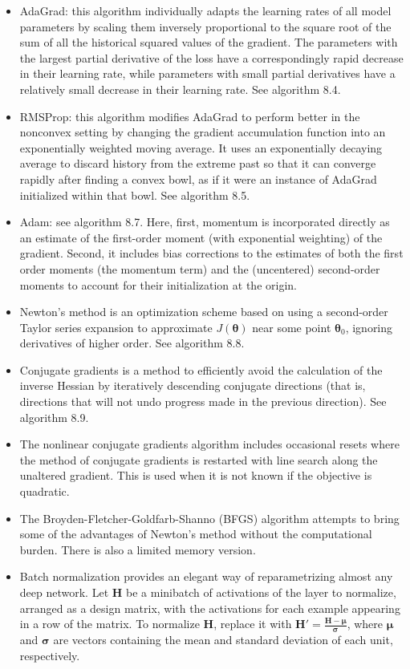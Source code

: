 \documentclass{article}
\begin{document}
\begin{itemize}
\item AdaGrad: this algorithm individually adapts the learning rates of all model parameters by scaling them inversely proportional to the square root of the sum of all the historical squared values of the gradient. The parameters with the largest partial derivative of the loss have a correspondingly rapid decrease in their learning rate, while parameters with small partial derivatives have a relatively small decrease in their learning rate. See algorithm 8.4.
\item RMSProp: this algorithm modifies AdaGrad to perform better in the nonconvex setting by changing the gradient accumulation function into an exponentially weighted moving average. It uses an exponentially decaying average to discard history from the extreme past so that it can converge rapidly after finding a convex bowl, as if it were an instance of AdaGrad initialized within that bowl. See algorithm 8.5.
\item Adam: see algorithm 8.7. Here, first, momentum is incorporated directly as an estimate of the first-order moment (with exponential weighting) of the gradient. Second, it includes bias corrections to the estimates of both the first order moments (the momentum term) and the (uncentered) second-order moments to account for their initialization at the origin.
\item Newton's method is an optimization scheme based on using a second-order Taylor series expansion to approximate \(J(\boldsymbol{\theta})\) near some point \(\boldsymbol{\theta}_0\), ignoring derivatives of higher order. See algorithm 8.8.
\item Conjugate gradients is a method to efficiently avoid the calculation of the inverse Hessian by iteratively descending conjugate directions (that is, directions that will not undo progress made in the previous direction). See algorithm 8.9.
\item The nonlinear conjugate gradients algorithm includes occasional resets where the method of conjugate gradients is restarted with line search along the unaltered gradient. This is used when it is not known if the objective is quadratic.
\item The Broyden-Fletcher-Goldfarb-Shanno (BFGS) algorithm attempts to bring some of the advantages of Newton's method without the computational burden. There is also a limited memory version.
\item Batch normalization provides an elegant way of reparametrizing almost any deep network. Let \(\boldsymbol{H}\) be a minibatch of activations of the layer to normalize, arranged as a design matrix, with the activations for each example appearing in a row of the matrix. To normalize \(\boldsymbol{H}\), replace it with \(\boldsymbol{H}' = \frac{\boldsymbol{H} - \boldsymbol{\mu}}{\boldsymbol{\sigma}}\), where \(\boldsymbol{\mu}\) and \(\boldsymbol{\sigma}\) are vectors containing the mean and standard deviation of each unit, respectively.

\end{itemize}
\end{document}
